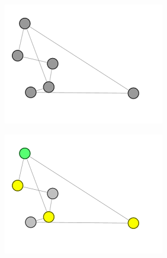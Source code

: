 \documentclass[12pt,twoside]{article}
\begin{document}
\begin{figure}[ht]
    \caption{}
    \label{fig: start game in graph}
    \begin{subfigure}{.5\textwidth}
        \unsethebrew
        \caption{}
        \centering
        \includegraphics[width=\textwidth,height=\textheight,keepaspectratio]{images/graph_start_board.png}
        \sethebrew
    \end{subfigure}%
    \begin{subfigure}{.5\textwidth}
        \unsethebrew
        \caption{}
        \centering
        \includegraphics[width=\textwidth,height=\textheight,keepaspectratio]{images/graph_press.png}
        \sethebrew
    \end{subfigure}%
\end{figure}
\end{document}
